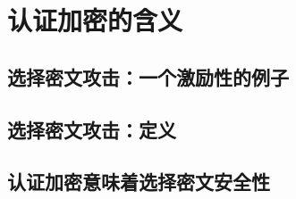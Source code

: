 \section{认证加密的含义}\label{sec:9-2}

\subsection{选择密文攻击：一个激励性的例子}\label{subsec:9-2-1}

\subsection{选择密文攻击：定义}\label{subsec:9-2-2}

\begin{game}\label{game:9-2}
	
\end{game}

\begin{definition}\label{def:9-5}
	
\end{definition}

\begin{definition}\label{def:9-6}
	
\end{definition}

\subsection{认证加密意味着选择密文安全性}\label{subsec:9-2-3}

\begin{theorem}\label{theo:9-1}
	
\end{theorem}
